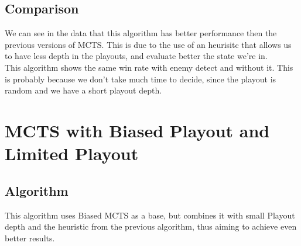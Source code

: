 \documentclass{article}
\begin{document}
  \subsection{Comparison}
  We can see in the data that this algorithm has better performance then the previous versions of MCTS. This is due to the use of an heurisitc that allows us to have less
  depth in the playouts, and evaluate better the state we're in. \\
  This algorithm shows the same win rate with enemy detect and without it. This is probably because we don't take much time to decide, since the playout is random
  and we have a short playout depth.\\

  \section{MCTS with Biased Playout and Limited Playout}

  \subsection{Algorithm}
  This algorithm uses Biased MCTS as a base, but combines it with small Playout depth and the heuristic from the previous algorithm, 
  thus aiming to achieve even better results.
  
\end{document}
